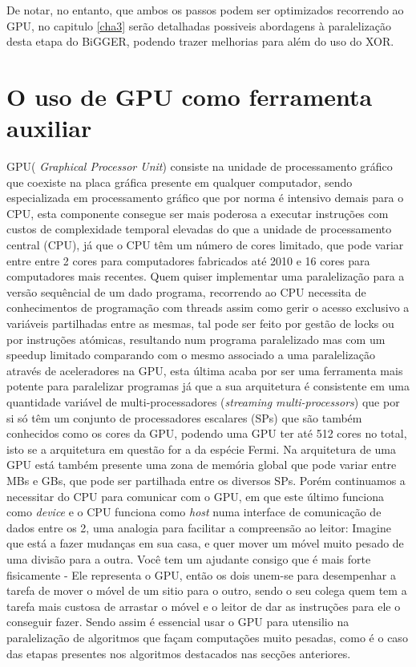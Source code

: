 De notar, no entanto, que ambos os passos podem ser optimizados recorrendo ao GPU, no capitulo \ref{cha3} serão detalhadas possiveis abordagens à paralelização desta etapa do BiGGER, podendo trazer melhorias para além do uso do XOR.





\section{ O uso de GPU como ferramenta auxiliar}
\label{gpus}
GPU( \textit{Graphical Processor Unit}) consiste na unidade de processamento gráfico que coexiste na placa gráfica presente em qualquer computador, sendo especializada em processamento gráfico que por norma é intensivo demais para o CPU, esta componente consegue ser mais poderosa a executar instruções com custos de complexidade temporal elevadas do que a unidade de processamento central (CPU), já que o CPU têm um número de cores limitado, que pode variar entre entre 2 cores para computadores fabricados até 2010 e 16 cores para computadores mais recentes. Quem quiser implementar uma paralelização para a versão sequêncial de um dado programa, recorrendo ao CPU necessita de conhecimentos de programação com threads assim como gerir o acesso exclusivo a variáveis partilhadas entre as mesmas, tal pode ser feito por gestão de locks ou por instruções atómicas, resultando num programa paralelizado mas com um speedup limitado comparando com o mesmo associado a uma paralelização através de aceleradores na GPU, esta última acaba por ser uma ferramenta mais potente para paralelizar programas já que a sua arquitetura é consistente em uma quantidade variável de multi-processadores (\textit{streaming multi-processors}) \cite{ritchiew.venkatramanvishwesh2010} que por si só têm um conjunto de processadores escalares (SPs) que são também conhecidos como os cores da GPU, podendo uma GPU ter até 512 cores no total, isto se a arquitetura em questão for a da espécie Fermi. Na arquitetura de uma GPU está também presente uma zona de memória global que pode variar entre MBs e GBs, que pode ser partilhada entre os diversos SPs.
Porém continuamos a necessitar do CPU para comunicar com o GPU, em que este último funciona como \textit{device} e o CPU funciona como \textit{host} numa interface de comunicação de dados entre os 2, uma analogia para facilitar a compreensão ao leitor: Imagine que está a fazer mudanças em sua casa, e quer mover um móvel muito pesado de uma divisão para a outra. Você tem um ajudante consigo que é mais forte fisicamente - Ele representa o GPU, então os dois unem-se para desempenhar a tarefa de mover o móvel de um sitio para o outro, sendo o seu colega quem tem a tarefa mais custosa de arrastar o móvel e o leitor de dar as instruções para ele o conseguir fazer.
Sendo assim é essencial usar o GPU para utensilio na paralelização de algoritmos que façam computações muito pesadas, como é o caso das etapas presentes nos algoritmos destacados nas secções anteriores.

